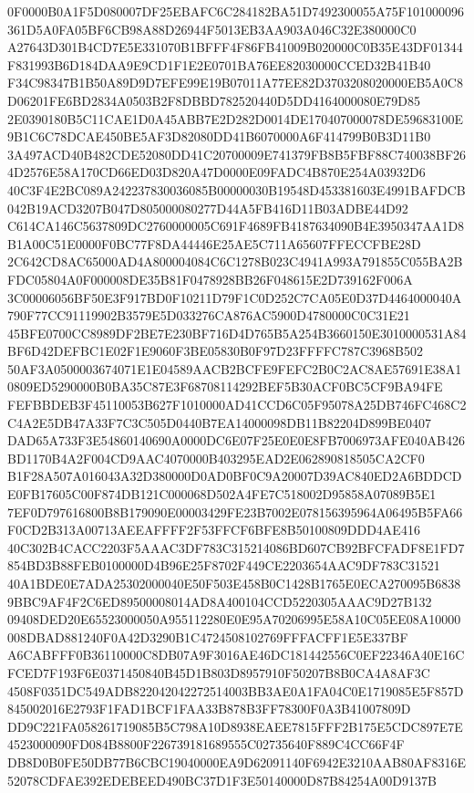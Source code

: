 \documentclass[UTF8,fontset=fandol,zihao=-4,a4paper]{ctexart}
\begin{document}
{{0F0000B0A1F5D080007DF25EBAFC6C284182BA51D7492300055A75F101000096361D5A0FA05BF6CB98A88D26944F5013EB3AA903A046C32E380000C0
A27643D301B4CD7E5E331070B1BFFF4F86FB41009B020000C0B35E43DF01344F831993B6D184DAA9E9CD1F1E2E0701BA76EE82030000CCED32B41B40
F34C98347B1B50A89D9D7EFE99E19B07011A77EE82D3703208020000EB5A0C8D06201FE6BD2834A0503B2F8DBBD782520440D5DD4164000080E79D85
2E0390180B5C11CAE1D0A45ABB7E2D282D0014DE170407000078DE59683100E9B1C6C78DCAE450BE5AF3D82080DD41B6070000A6F414799B0B3D11B0
3A497ACD40B482CDE52080DD41C20700009E741379FB8B5FBF88C740038BF264D2576E58A170CD66ED03D820A47D0000E09FADC4B870E254A03932D6
40C3F4E2BC089A242237830036085B00000030B19548D453381603E4991BAFDCB042B19ACD3207B047D805000080277D44A5FB416D11B03ADBE44D92
C614CA146C5637809DC2760000005C691F4689FB4187634090B4E3950347AA1D8B1A00C51E0000F0BC77F8DA44446E25AE5C711A65607FFECCFBE28D
2C642CD8AC65000AD4A800004084C6C1278B023C4941A993A791855C055BA2BFDC05804A0F000008DE35B81F0478928BB26F048615E2D739162F006A
3C00006056BF50E3F917BD0F10211D79F1C0D252C7CA05E0D37D4464000040A790F77CC91119902B3579E5D033276CA876AC5900D4780000C0C31E21
45BFE0700CC8989DF2BE7E230BF716D4D765B5A254B3660150E3010000531A84BF6D42DEFBC1E02F1E9060F3BE05830B0F97D23FFFFC787C3968B502
50AF3A0500003674071E1E04589AACB2BCFE9FEFC2B0C2AC8AE57691E38A10809ED5290000B0BA35C87E3F68708114292BEF5B30ACF0BC5CF9BA94FE
FEFBBDEB3F45110053B627F1010000AD41CCD6C05F95078A25DB746FC468C2C4A2E5DB47A33F7C3C505D0440B7EA14000098DB11B82204D899BE0407
DAD65A733F3E54860140690A0000DC6E07F25E0E0E8FB7006973AFE040AB426BD1170B4A2F004CD9AAC4070000B403295EAD2E062890818505CA2CF0
B1F28A507A016043A32D380000D0AD0BF0C9A20007D39AC840ED2A6BDDCDE0FB17605C00F874DB121C000068D502A4FE7C518002D95858A07089B5E1
7EF0D797616800B8B179090E00003429FE23B7002E078156395964A06495B5FA66F0CD2B313A00713AEEAFFFF2F53FFCF6BFE8B50100809DDD4AE416
40C302B4CACC2203F5AAAC3DF783C315214086BD607CB92BFCFADF8E1FD7854BD3B88FEB0100000D4B96E25F8702F449CE2203654AAC9DF783C31521
40A1BDE0E7ADA25302000040E50F503E458B0C1428B1765E0ECA270095B68389BBC9AF4F2C6ED89500008014AD8A400104CCD5220305AAAC9D27B132
09408DED20E65523000050A955112280E0E95A70206995E58A10C05EE08A10000008DBAD881240F0A42D3290B1C4724508102769FFFACFF1E5E337BF
A6CABFFF0B36110000C8DB07A9F3016AE46DC181442556C0EF22346A40E16CFCED7F193F6E0371450840B45D1B803D8957910F50207B8B0CA4A8AF3C
4508F0351DC549ADB822042042272514003BB3AE0A1FA04C0E1719085E5F857D845002016E2793F1FAD1BCF1FAA33B878B3FF78300F0A3B41007809D
DD9C221FA058261719085B5C798A10D8938EAEE7815FFF2B175E5CDC897E7E4523000090FD084B8800F226739181689555C02735640F889C4CC66F4F
DB8D0B0FE50DB77B6CBC19040000EA9D62091140F6942E3210AAB80AF8316E52078CDFAE392EDEBEED490BC37D1F3E50140000D87B84254A00D9137B
}}
\end{document}
